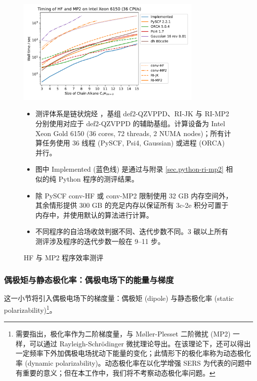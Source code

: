 \begin{figure}
  \centering
  \caption{HF 与 MP2 程序效率测评}
  \label{fig.timing-rimp2-implemented}
  \includegraphics[width=0.8\textwidth]{assets/timing-rimp2-implemented.pdf}

  \raggedright
  \begin{itemize}[nosep]
    \item 测评体系是链状烷烃 ，基组 def2-QZVPPD、RI-JK 与 RI-MP2 分别使用对应于 def2-QZVPPD 的辅助基组。计算设备为 Intel Xeon Gold 6150 (36 cores, 72 threads, 2 NUMA nodes)；所有计算任务使用 36 线程 (PySCF, Psi4, Gaussian) 或进程 (ORCA) 并行。
    \item 图中 Implemented (蓝色线) 是通过与附录 \ref{sec.python-ri-mp2} 相似的纯 Python 程序的测评结果。
    \item 除 PySCF conv-HF 或 conv-MP2 限制使用 32 GB 内存空间外，其余情形提供 300 GB 的充足内存以保证所有 3c-2e 积分可置于内存中，并使用默认的算法进行计算。
    \item 不同程序的自洽场收敛判据不同、迭代步数不同。3 碳以上所有测评涉及程序的迭代步数一般在 9--11 步。
  \end{itemize}
\end{figure}

\subsubsection{偶极矩与静态极化率：偶极电场下的能量与梯度}

这一小节将引入偶极电场下的梯度量：偶极矩 (dipole) 与静态极化率 (static polarizability)\footnote{需要指出，极化率作为二阶梯度量，与 M\o{}ller-Plesset 二阶微扰 (MP2) 一样，可以通过 Rayleigh-Schr\"odinger 微扰理论导出。在该理论下，还可以得出一定频率下外加偶极电场扰动下能量的变化；此情形下的极化率称为动态极化率 (dynamic polarizability)。动态极化率在以化学增强 SERS 为代表的问题中有重要的意义\cite{Jensen-Schatz.CSR.2008, Perez-Jimenez-Ren.CS.2020, Li-Xu.C.2022}；但在本工作中，我们将不考察动态极化率问题。}。

